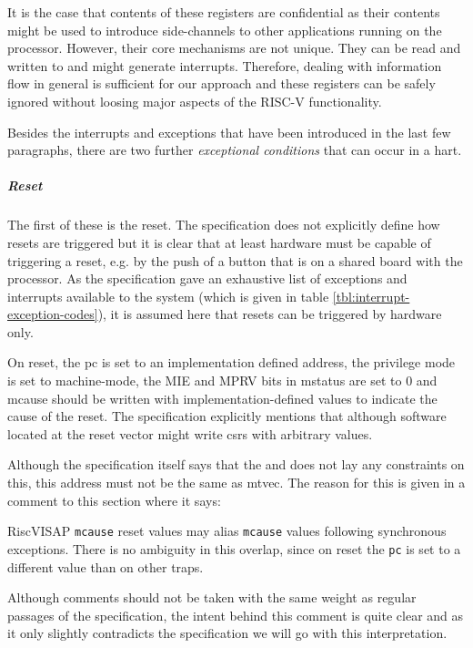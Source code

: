 It is the case that contents of these registers are confidential as their contents might be used to introduce side-channels to other applications running on the processor.
However, their core mechanisms are not unique.
They can be read and written to and might generate interrupts.
Therefore, dealing with information flow in general is sufficient for our approach and these registers can be safely ignored without loosing major aspects of the RISC-V functionality.

Besides the interrupts and exceptions that have been introduced in the last few paragraphs, there are two further \textit{exceptional conditions} that can occur in a \gls{hart}.

\subparagraph{Reset}
The first of these is the reset.
The specification does not explicitly define how resets are triggered but it is clear that at least hardware must be capable of triggering a reset, e.g. by the push of a button that is on a shared board with the processor.
As the specification gave an exhaustive list of exceptions and interrupts available to the system (which is given in table \ref{tbl:interrupt-exception-codes}), it is assumed here that resets can be triggered by hardware only.

On reset, the \gls{pc} is set to an implementation defined address, the privilege mode is set to machine-mode, the MIE and MPRV bits in \gls{mstatus} are set to 0 and \gls{mcause} should be written with implementation-defined values to indicate the cause of the reset.
The specification explicitly mentions that  although software located at the reset vector might write \glspl{csr} with arbitrary values.

Although the specification itself says that the  and does not lay any constraints on this, this address must not be the same as \gls{mtvec}.
The reason for this is given in a comment to this section where it says:
\begin{displaycquote}{RiscVISAP}
    \texttt{mcause} reset values may alias \texttt{mcause} values following synchronous exceptions.
    There is no ambiguity in this overlap, since on reset the \texttt{pc} is set to a different value than on other traps.
\end{displaycquote}

Although comments should not be taken with the same weight as regular passages of the specification, the intent behind this comment is quite clear and as it only slightly contradicts the specification we will go with this interpretation.


